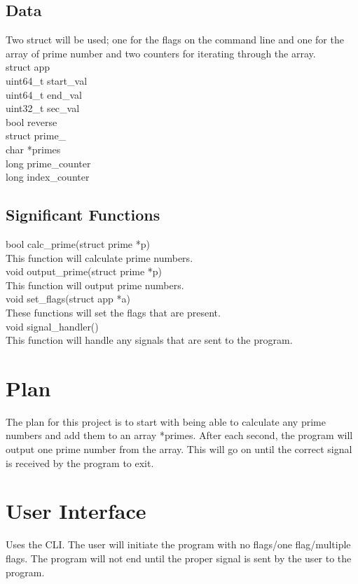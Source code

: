 \documentclass{article}
\begin{document}
  \subsection*{Data}
Two struct will be used; one for the flags on the command line and one for the array of prime number and two counters for iterating through the array.\\
struct app{\\
\qquad uint64\_t start\_val\\
\qquad uint64\_t end\_val\\
\qquad uint32\_t sec\_val\\
\qquad bool reverse\\
}
struct prime\_{\\
\qquad char *primes\\
\qquad long prime\_counter\\
\qquad long index\_counter\\
}
  \subsection*{Significant Functions}
  bool calc\_prime(struct prime *p)\\
  \qquad This function will calculate prime numbers.\\
  void output\_prime(struct prime *p)\\
  \qquad This function will output prime numbers.\\
  void set\_flags(struct app *a)\\
  \qquad These functions will set the flags that are present.\\
  void signal\_handler()\\
  \qquad This function will handle any signals that are sent to the program.\\
  \section*{Plan}
  The plan for this project is to start with being able to calculate any prime numbers and add them to an array *primes. After each second, the program will output one prime number from the array. This will go on until the correct signal is received by the program to exit.
  \section*{User Interface}
Uses the CLI. The user will initiate the program with no flags/one flag/multiple flags. The program will not end until the proper signal is sent by the user to the program. 
\\
\\
\end{document}
